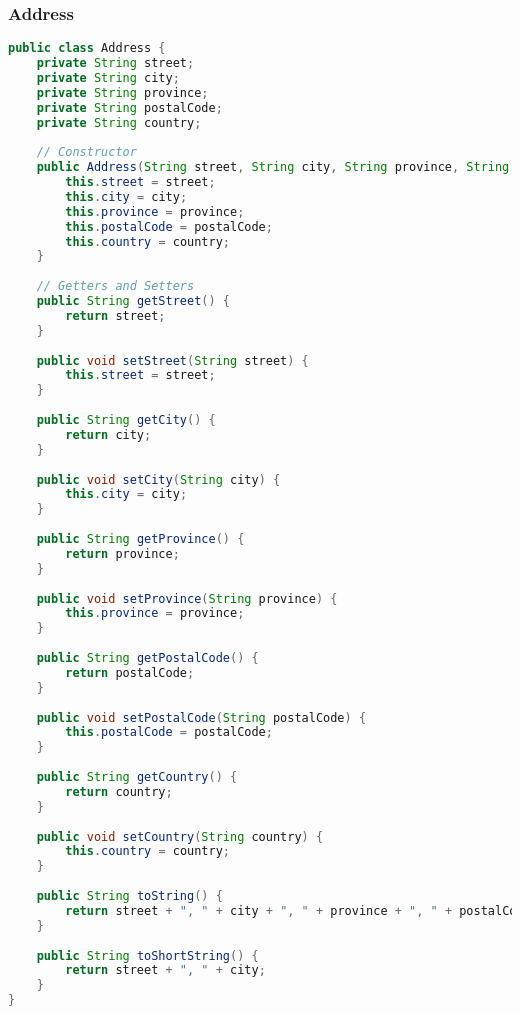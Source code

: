 \subsubsection{Address}
\begin{lstlisting}[language=java]
public class Address {
	private String street;
	private String city;
	private String province;
	private String postalCode;
	private String country;
	
	// Constructor
	public Address(String street, String city, String province, String postalCode, String country){
		this.street = street;
		this.city = city;
		this.province = province;
		this.postalCode = postalCode;
		this.country = country;
	}
	
	// Getters and Setters
	public String getStreet() {
		return street;
	}
	
	public void setStreet(String street) {
		this.street = street;
	}
	
	public String getCity() {
		return city;
	}
	
	public void setCity(String city) {
		this.city = city;
	}
	
	public String getProvince() {
		return province;
	}
	
	public void setProvince(String province) {
		this.province = province;
	}
	
	public String getPostalCode() {
		return postalCode;
	}
	
	public void setPostalCode(String postalCode) {
		this.postalCode = postalCode;
	}
	
	public String getCountry() {
		return country;
	}
	
	public void setCountry(String country) {
		this.country = country;
	}
	
	public String toString() {
		return street + ", " + city + ", " + province + ", " + postalCode + ", " + country;
	}
	
	public String toShortString() {
		return street + ", " + city;
	}
}
\end{lstlisting}

